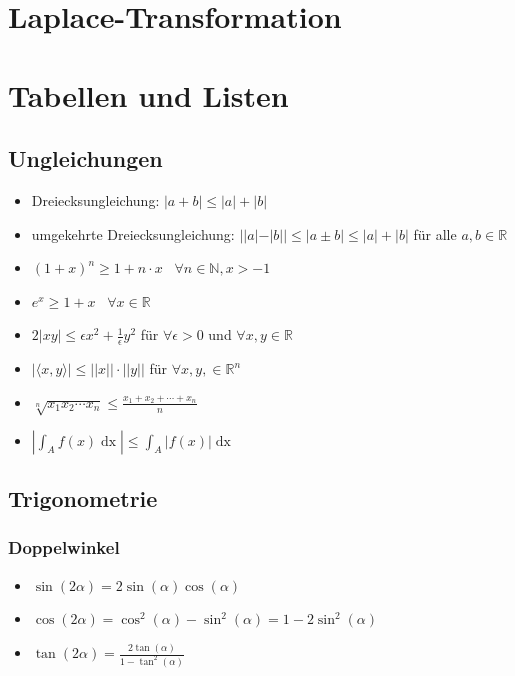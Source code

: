 \documentclass[a4paper,10pt]{article}
\def\R{\mathbb{R}}
\begin{document}
\section{Laplace-Transformation}

\section{Tabellen und Listen}

\subsection{Ungleichungen}

\begin{itemize}
  \item Dreiecksungleichung: $|a + b| \leq |a| + |b|$
  \item umgekehrte Dreiecksungleichung: $||a| - |b|| \leq |a \pm b| \leq |a| + |b|$ für alle $a,b \in \R$
  \item $(1+x)^n \geq 1+ n\cdot x$ \, $\forall n\in \mathbb{N}, x > -1$
  \item $e^x \geq 1 + x$ \, $\forall x\in \mathbb{R}$
  \item $2|xy| \leq \epsilon x^2 + \frac{1}{\epsilon} y^2$ für $\forall \epsilon > 0$ und $\forall x,y \in \mathbb{R}$
  \item $|\langle x,y \rangle| \leq ||x|| \cdot ||y||$ für $\forall x,y, \in \mathbb{R}^n$
  \item $\sqrt[n]{x_1 x_2 \cdots x_n} \leq \frac{x_1 + x_2 + \cdots + x_n}{n}$
  \item $\left| \int_A f(x) \mathop{dx}\right| \le \int_A \left|f(x)\right| \mathop{dx}$
\end{itemize}

\subsection{Trigonometrie}

\subsubsection{Doppelwinkel}
\begin{itemize}
 \item $\sin(2\alpha) = 2 \sin(\alpha) \cos(\alpha)$
 \item $\cos(2\alpha) = \cos^2(\alpha) - \sin^2(\alpha) = 1 - 2 \sin^2(\alpha)$
 \item $\tan(2\alpha) = \frac{2\tan(\alpha)}{1 - \tan^2(\alpha)}$
\end{itemize}
\end{document}
